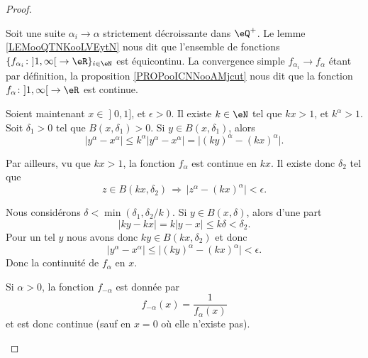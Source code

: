 \begin{proof}
\begin{subproof}
\begin{subproof}
			Soit une suite \( \alpha_i\to \alpha\) strictement décroissante dans \( \eQ^+\). Le lemme \ref{LEMooQTNKooLVEytN} nous dit que l'ensemble de fonctions  \( \{ f_{\alpha_i}\colon \mathopen] 1 , \infty \mathclose[\to \eR \}_{i\in \eN}\) est équicontinu. La convergence simple \( f_{\alpha_i}\to f_{\alpha}\) étant par définition, la proposition \ref{PROPooICNNooAMjcut} nous dit que la fonction \( f_{\alpha}\colon \mathopen] 1 , \infty \mathclose[\to \eR\) est continue.


				Soient maintenant \( x\in \mathopen] 0 , 1 \mathclose]\), et \( \epsilon>0\). Il existe \( k\in \eN\) tel que \( kx>1\), et \( k^{\alpha}>1\). Soit \( \delta_1>0\) tel que \( B(x,\delta_1)>0\). Si \( y\in B(x,\delta_1)\), alors
			\begin{equation}
				| y^{\alpha}-x^{\alpha} |\leq k^{\alpha}| y^{\alpha}-x^{\alpha} |=\big| (ky)^{\alpha}-(kx)^{\alpha} \big|.
			\end{equation}

			Par ailleurs, vu que \( kx>1\), la fonction \( f_{\alpha}\) est continue en \( kx\). Il existe donc \( \delta_2\) tel que
			\begin{equation}
				z\in B(kx,\delta_2)\,\Rightarrow\,\big| z^{\alpha}-(kx)^{\alpha} \big|<\epsilon.
			\end{equation}

			Nous considérons \( \delta<\min(\delta_1,\delta_2/k)\). Si \( y\in B(x,\delta)\), alors d'une part
			\begin{equation}
				| ky-kx |=k| y-x |\leq k\delta<\delta_2.
			\end{equation}
			Pour un tel \( y\) nous avons donc \( ky\in B(kx,\delta_2)\) et donc
			\begin{equation}
				| y^{\alpha}-x^{\alpha} |\leq \big| (ky)^{\alpha}-(kx)^{\alpha} \big|<\epsilon.
			\end{equation}
			Donc la continuité de \( f_{\alpha}\) en \( x\).

		\end{subproof}


		Si \( \alpha>0\), la fonction \( f_{-\alpha}\) est donnée par
		\begin{equation}
			f_{-\alpha}(x)=\frac{1}{  f_{\alpha}(x) }
		\end{equation}
		et est donc continue (sauf en \( x=0\) où elle n'existe pas).
	\end{subproof}
\end{proof}

